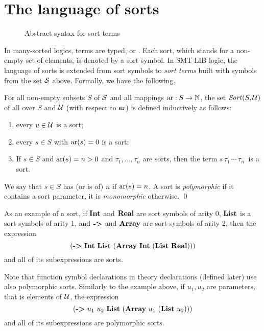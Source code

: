 \section{The language of sorts}

\begin{figure}[t]
\sortterms
\caption{Abstract syntax for sort terms}
\label{fig:abstract-sorts}
\end{figure}

In many-sorted logics, terms are typed, or . 
Each sort, which stands for a non-empty set of elements, is denoted 
by a sort symbol.
In SMT-LIB logic, the language of sorts is extended from sort symbols 
to \emph{sort terms} built with symbols from the set $\mathcal{S}$ above.
Formally, we have the following.

\begin{definition}[Sorts]
For all non-empty subsets $S$ of $\mathcal{S}$ and 
all mappings $\mathrm{ar}:S \to \mathbb{N}$,
the set $\mathit{Sort}(S, \mathcal{U})$ of all  over $S$ and $\mathcal{U}$ 
(with respect to $\mathrm{ar}$)
is defined inductively as follows:
\begin{enumerate}
\item 
every $u \in \mathcal{U}$ is a sort;
\item
every $s \in S$ with $\mathrm{ar}(s) = 0$ is a sort;
\item
If $s \in S$ and $\mathrm{ar}(s) = n > 0$ and
$\tau_1, \ldots, \tau_n$ are sorts,
then the term
$s\,\tau_1\,\cdots\,\tau_n\:$ is a sort.
\end{enumerate}
We say that $s \in S$ has (or is of)  $n$ 
if $\mathrm{ar}(s) = n$.
A sort is \emph{polymorphic} 
if it contains a sort parameter, it is \emph{monomorphic} otherwise.
\qed
\end{definition}

As an example of a sort,
if $\textbf{Int}$ and $\textbf{Real}$ are sort symbols of arity 0, 
$\textbf{List}$ is a sort symbols of arity 1, and
$\textbf{->}$ and $\textbf{Array}$ are sort symbols of arity 2,
then the expression
\[
  (\akey{->}\ \akey{Int}\ \akey{List}\ (\akey{Array}\ \akey{Int}\ (\akey{List}\ \akey{Real})))
\] 
and all of its subexpressions are sorts.

Note that function symbol declarations in theory declarations (defined later)
use also polymorphic sorts.
Similarly to the example above,
if $u_1, u_2$ are parameters, that is elements of $\mathcal{U}$,
the expression
\[
  (\akey{->}\ u_1\ u_2\ \akey{List}\ (\akey{Array}\ u_1\ (\akey{List}\ u_2)))
\]
and all of its subexpressions are polymorphic sorts.

